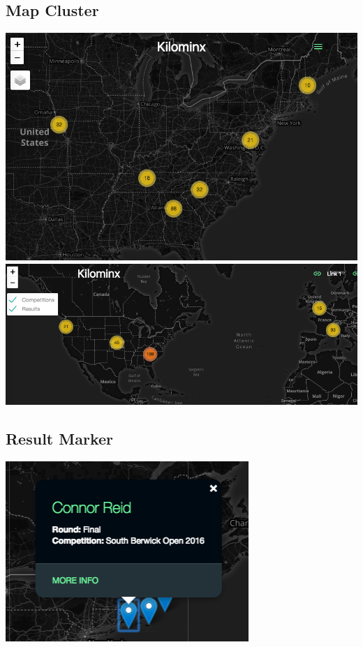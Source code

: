 \documentclass[12pt]{article}
\begin{document}
		\subsection{Map Cluster}
			\begin{center}
				\includegraphics[scale=0.427]{map_clustering.png}\\
				\vspace{5mm}
				\includegraphics[scale=0.35]{map_filtering.png}\\
 			\end{center}

		\subsection{Result Marker}
			\begin{center}
				\includegraphics[scale=0.7]{result_marker.png}\\
 			\end{center}
\end{document}

